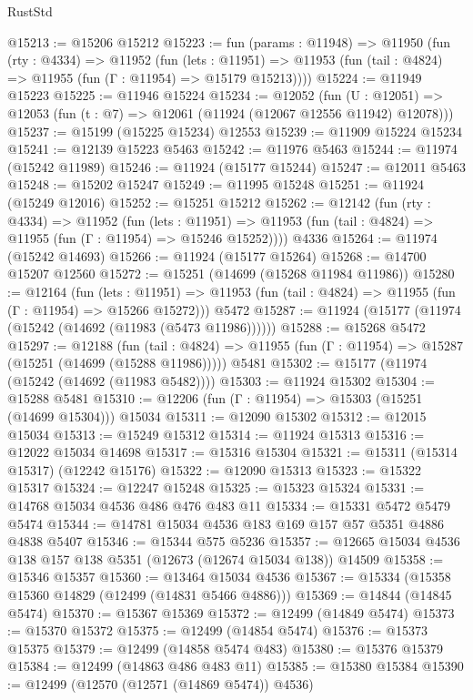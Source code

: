 \begin{lexlean}{RustStd}
\begin{coremodule}
@15213 := @15206 @15212
@15223 := fun (params : @11948) =>
  @11950
    (fun (rty : @4334) =>
    @11952
      (fun (lets : @11951) =>
      @11953 (fun (tail : @4824) => @11955 (fun (Γ : @11954) => @15179 @15213))))
@15224 := @11949 @15223
@15225 := @11946 @15224
@15234 := @12052
    (fun (U : @12051) => @12053 (fun (t : @7) => @12061 (@11924 (@12067 @12556 @11942) @12078)))
@15237 := @15199 (@15225 @15234) @12553
@15239 := @11909 @15224 @15234
@15241 := @12139 @15223 @5463
@15242 := @11976 @5463
@15244 := @11974 (@15242 @11989)
@15246 := @11924 (@15177 @15244)
@15247 := @12011 @5463
@15248 := @15202 @15247
@15249 := @11995 @15248
@15251 := @11924 (@15249 @12016)
@15252 := @15251 @15212
@15262 := @12142
    (fun (rty : @4334) =>
    @11952
      (fun (lets : @11951) =>
      @11953 (fun (tail : @4824) => @11955 (fun (Γ : @11954) => @15246 @15252))))
    @4336
@15264 := @11974 (@15242 @14693)
@15266 := @11924 (@15177 @15264)
@15268 := @14700 @15207 @12560
@15272 := @15251 (@14699 (@15268 @11984 @11986))
@15280 := @12164
    (fun (lets : @11951) =>
    @11953 (fun (tail : @4824) => @11955 (fun (Γ : @11954) => @15266 @15272)))
    @5472
@15287 := @11924 (@15177 (@11974 (@15242 (@14692 (@11983 (@5473 @11986))))))
@15288 := @15268 @5472
@15297 := @12188
    (fun (tail : @4824) => @11955 (fun (Γ : @11954) => @15287 (@15251 (@14699 (@15288 @11986)))))
    @5481
@15302 := @15177 (@11974 (@15242 (@14692 (@11983 @5482))))
@15303 := @11924 @15302
@15304 := @15288 @5481
@15310 := @12206 (fun (Γ : @11954) => @15303 (@15251 (@14699 @15304))) @15034
@15311 := @12090 @15302
@15312 := @12015 @15034
@15313 := @15249 @15312
@15314 := @11924 @15313
@15316 := @12022 @15034 @14698
@15317 := @15316 @15304
@15321 := @15311 (@15314 @15317) (@12242 @15176)
@15322 := @12090 @15313
@15323 := @15322 @15317
@15324 := @12247 @15248
@15325 := @15323 @15324
@15331 := @14768 @15034 @4536 @486 @476 @483 @11
@15334 := @15331 @5472 @5479 @5474
@15344 := @14781 @15034 @4536 @183 @169 @157 @57 @5351 @4886 @4838 @5407
@15346 := @15344 @575 @5236
@15357 := @12665 @15034 @4536 @138 @157 @138 @5351 (@12673 (@12674 @15034 @138)) @14509
@15358 := @15346 @15357
@15360 := @13464 @15034 @4536
@15367 := @15334 (@15358 @15360 @14829 (@12499 (@14831 @5466 @4886)))
@15369 := @14844 (@14845 @5474)
@15370 := @15367 @15369
@15372 := @12499 (@14849 @5474)
@15373 := @15370 @15372
@15375 := @12499 (@14854 @5474)
@15376 := @15373 @15375
@15379 := @12499 (@14858 @5474 @483)
@15380 := @15376 @15379
@15384 := @12499 (@14863 @486 @483 @11)
@15385 := @15380 @15384
@15390 := @12499 (@12570 (@12571 (@14869 @5474)) @4536)

\end{coremodule}
\end{lexlean}
